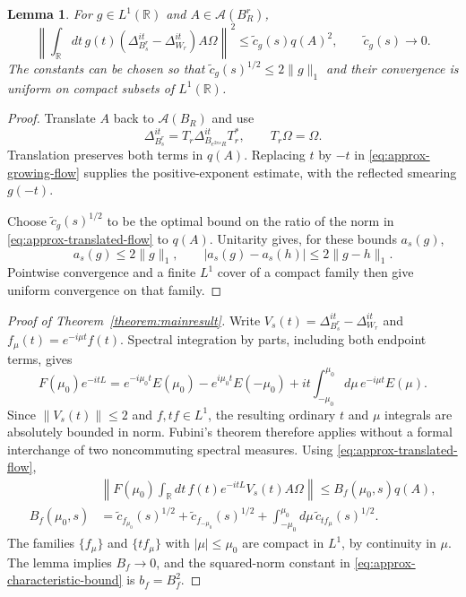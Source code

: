 \documentclass[a4paper,11pt]{article}
\newtheorem{lemma}[theorem]{Lemma}
\theoremstyle{definition}
\begin{document}
\begin{lemma}\label{lemma:extensionfredenhagen}
For $g\in L^1(\mathbb R)$ and $A\in\mathcal A(B_R^r)$,
\begin{equation}
 \left\|\int_{\mathbb R}dt\,g(t)
 (\Delta_{B_s^r}^{it}-\Delta_{W_r}^{it})A\Omega\right\|^2
 \leq\widetilde c_g(s)q(A)^2,
 \qquad \widetilde c_g(s)\longrightarrow0.
 \label{eq:approx-translated-flow}
\end{equation}
The constants can be chosen so that $\widetilde c_g(s)^{1/2}\leq2\|g\|_1$ and their convergence is uniform on compact subsets of $L^1(\mathbb R)$.
\end{lemma}
\begin{proof}
Translate $A$ back to $\mathcal A(B_R)$ and use
\[
 \Delta_{B_s^r}^{it}=T_r\Delta_{B_{e^{2\pi s}R}}^{it}T_r^*,
 \qquad T_r\Omega=\Omega.
\]
Translation preserves both terms in $q(A)$. Replacing $t$ by $-t$ in \eqref{eq:approx-growing-flow} supplies the positive-exponent estimate, with the reflected smearing $g(-t)$.

Choose $\widetilde c_g(s)^{1/2}$ to be the optimal bound on the ratio of the norm in \eqref{eq:approx-translated-flow} to $q(A)$. Unitarity gives, for these bounds $a_s(g)$,
\[
 a_s(g)\leq2\|g\|_1,
 \qquad |a_s(g)-a_s(h)|\leq2\|g-h\|_1.
\]
Pointwise convergence and a finite $L^1$ cover of a compact family then give uniform convergence on that family.
\end{proof}

\begin{proof}[Proof of Theorem~\ref{theorem:mainresult}]
Write $V_s(t)=\Delta_{B_s^r}^{it}-\Delta_{W_r}^{it}$ and $f_\mu(t)=e^{-i\mu t}f(t)$. Spectral integration by parts, including both endpoint terms, gives
\begin{equation}
 F(\mu_0)e^{-itL}
 =e^{-i\mu_0t}E(\mu_0)-e^{i\mu_0t}E(-\mu_0)
 +it\int_{-\mu_0}^{\mu_0}d\mu\,e^{-i\mu t}E(\mu).
 \label{eq:approx-spectral-parts}
\end{equation}
Since $\|V_s(t)\|\leq2$ and $f,tf\in L^1$, the resulting ordinary $t$ and $\mu$ integrals are absolutely bounded in norm. Fubini's theorem therefore applies without a formal interchange of two noncommuting spectral measures. Using \eqref{eq:approx-translated-flow},
\begin{align}
 &\left\|F(\mu_0)\int_{\mathbb R}dt\,f(t)e^{-itL}V_s(t)A\Omega\right\|
 \leq B_f(\mu_0,s)q(A),\nonumber\\
 B_f(\mu_0,s)
 &=\widetilde c_{f_{\mu_0}}(s)^{1/2}
 +\widetilde c_{f_{-\mu_0}}(s)^{1/2}
 +\int_{-\mu_0}^{\mu_0}d\mu\,\widetilde c_{tf_\mu}(s)^{1/2}.
 \label{eq:approx-bound-amplitude}
\end{align}
The families $\{f_\mu\}$ and $\{tf_\mu\}$ with $|\mu|\leq\mu_0$ are compact in $L^1$, by continuity in $\mu$. The lemma implies $B_f\to0$, and the squared-norm constant in \eqref{eq:approx-characteristic-bound} is $b_f=B_f^2$.
\end{proof}
\end{document}
